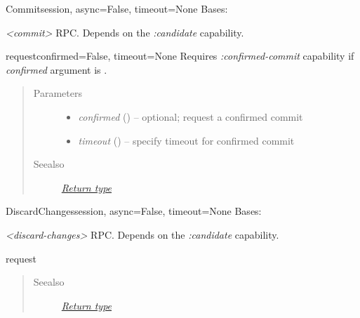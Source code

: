 \documentclass[a4paper,10pt,english]{manual}
\begin{document}
\hypertarget{ncclient.operations.Commit}{}\begin{classdesc}{Commit}{session, async=False, timeout=None}
Bases: \hyperlink{ncclient.operations.rpc.RPC}{}

\emph{\textless{}commit\textgreater{}} RPC. Depends on the \emph{:candidate} capability.

\hypertarget{ncclient.operations.Commit.request}{}\begin{methoddesc}{request}{confirmed=False, timeout=None}
Requires \emph{:confirmed-commit} capability if \emph{confirmed} argument is
\href{http://docs.python.org/library/constants.html\#True}{}.
\begin{quote}\begin{description}
\item[Parameters]\begin{itemize}
\item {} 
\emph{confirmed} (\href{http://docs.python.org/library/functions.html\#bool}{}) -- optional; request a confirmed commit

\item {} 
\emph{timeout} (\href{http://docs.python.org/library/functions.html\#int}{}) -- specify timeout for confirmed commit

\end{itemize}

\item[Seealso]
\hyperlink{return}{\emph{Return type}}

\end{description}\end{quote}
\end{methoddesc}
\end{classdesc}

\hypertarget{ncclient.operations.DiscardChanges}{}\begin{classdesc}{DiscardChanges}{session, async=False, timeout=None}
Bases: \hyperlink{ncclient.operations.rpc.RPC}{}

\emph{\textless{}discard-changes\textgreater{}} RPC. Depends on the \emph{:candidate} capability.

\hypertarget{ncclient.operations.DiscardChanges.request}{}\begin{methoddesc}{request}{}~\begin{quote}\begin{description}
\item[Seealso]
\hyperlink{return}{\emph{Return type}}

\end{description}\end{quote}
\end{methoddesc}
\end{classdesc}
\end{document}
